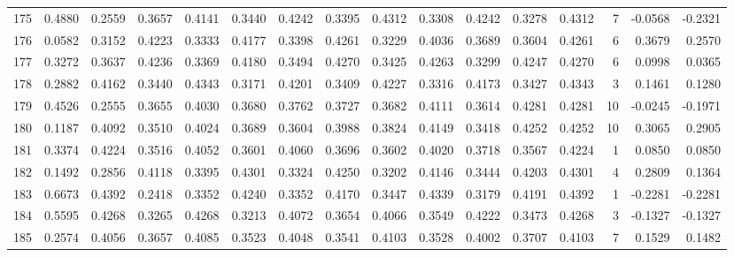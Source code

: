 \begin{tabular}{lrrrrrrrrrrrrrrr}
175 &      0.4880 &  0.2559 &  0.3657 &  0.4141 &  0.3440 &  0.4242 &  0.3395 &  0.4312 &  0.3308 &  0.4242 &   0.3278 &     0.4312 &      7 &                   -0.0568 &                    -0.2321 \\
176 &      0.0582 &  0.3152 &  0.4223 &  0.3333 &  0.4177 &  0.3398 &  0.4261 &  0.3229 &  0.4036 &  0.3689 &   0.3604 &     0.4261 &      6 &                    0.3679 &                     0.2570 \\
177 &      0.3272 &  0.3637 &  0.4236 &  0.3369 &  0.4180 &  0.3494 &  0.4270 &  0.3425 &  0.4263 &  0.3299 &   0.4247 &     0.4270 &      6 &                    0.0998 &                     0.0365 \\
178 &      0.2882 &  0.4162 &  0.3440 &  0.4343 &  0.3171 &  0.4201 &  0.3409 &  0.4227 &  0.3316 &  0.4173 &   0.3427 &     0.4343 &      3 &                    0.1461 &                     0.1280 \\
179 &      0.4526 &  0.2555 &  0.3655 &  0.4030 &  0.3680 &  0.3762 &  0.3727 &  0.3682 &  0.4111 &  0.3614 &   0.4281 &     0.4281 &     10 &                   -0.0245 &                    -0.1971 \\
180 &      0.1187 &  0.4092 &  0.3510 &  0.4024 &  0.3689 &  0.3604 &  0.3988 &  0.3824 &  0.4149 &  0.3418 &   0.4252 &     0.4252 &     10 &                    0.3065 &                     0.2905 \\
181 &      0.3374 &  0.4224 &  0.3516 &  0.4052 &  0.3601 &  0.4060 &  0.3696 &  0.3602 &  0.4020 &  0.3718 &   0.3567 &     0.4224 &      1 &                    0.0850 &                     0.0850 \\
182 &      0.1492 &  0.2856 &  0.4118 &  0.3395 &  0.4301 &  0.3324 &  0.4250 &  0.3202 &  0.4146 &  0.3444 &   0.4203 &     0.4301 &      4 &                    0.2809 &                     0.1364 \\
183 &      0.6673 &  0.4392 &  0.2418 &  0.3352 &  0.4240 &  0.3352 &  0.4170 &  0.3447 &  0.4339 &  0.3179 &   0.4191 &     0.4392 &      1 &                   -0.2281 &                    -0.2281 \\
184 &      0.5595 &  0.4268 &  0.3265 &  0.4268 &  0.3213 &  0.4072 &  0.3654 &  0.4066 &  0.3549 &  0.4222 &   0.3473 &     0.4268 &      3 &                   -0.1327 &                    -0.1327 \\
185 &      0.2574 &  0.4056 &  0.3657 &  0.4085 &  0.3523 &  0.4048 &  0.3541 &  0.4103 &  0.3528 &  0.4002 &   0.3707 &     0.4103 &      7 &                    0.1529 &                     0.1482 \\

\end{tabular}
